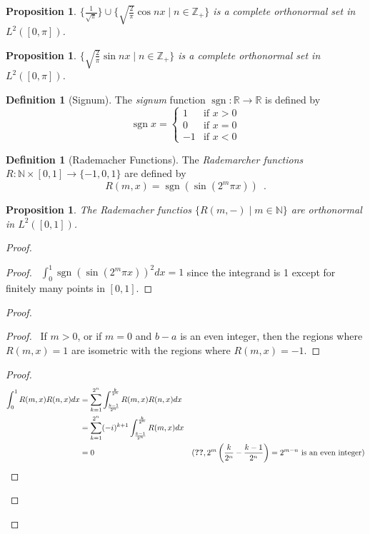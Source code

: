 \documentclass{book}
\let\qed\relax
\newtheorem{prop}[ax]{Proposition}
\theoremstyle{definition}
\newtheorem{df}[ax]{Definition}
\newcommand{\sgn}{\ensuremath{\operatorname{sgn}}}
\begin{document}
\begin{prop}
$\{\frac{1}{\sqrt{\pi}}\} \cup \{\sqrt{\frac{2}{\pi}} \cos nx \mid n \in \mathbb{Z}_+ \}$ is a complete orthonormal set in $L^2([0,\pi])$.
\end{prop}

\begin{prop}
$\{\sqrt{\frac{2}{\pi}} \sin n x \mid n \in \mathbb{Z}_+ \}$ is a complete orthonormal set in $L^2([0,\pi])$.
\end{prop}

\begin{df}[Signum]
The \emph{signum} function $\sgn : \mathbb{R} \rightarrow \mathbb{R}$ is defined by
\[ \sgn x = \begin{cases}
1 & \text{if } x > 0 \\
0 & \text{if } x = 0 \\
-1 & \text{if } x < 0
\end{cases} \]
\end{df}

\begin{df}[Rademacher Functions]
The \emph{Rademarcher functions} $R : \mathbb{N} \times [0,1] \rightarrow \{-1,0,1\}$ are defined by
\[ R(m,x) = \sgn(\sin(2^m \pi x)) \enspace . \]
\end{df}

\begin{prop}
The Rademacher functios $\{ R(m,-) \mid m \in \mathbb{N} \}$ are orthonormal in $L^2([0,1])$.
\end{prop}

\begin{proof}
\pf
{}
\begin{proof}
	\pf\ $\int_0^1 \sgn(\sin(2^m \pi x))^2 dx = 1$ since the integrand is 1 except for finitely many points in $[0,1]$.
\end{proof}
\begin{proof}
	\begin{proof}
		\pf\ If $m > 0$, or if $m = 0$ and $b-a$ is an even integer, then the regions where $R(m,x) = 1$ are isometric with the regions where $R(m,x) = -1$.
	\end{proof}
	\begin{proof}
		\pf
		\begin{align*}
			\int_0^1 R(m,x) R(n,x) dx
			& = \sum_{k=1}^{2^n} \int_{\frac{k-1}{2^n}}^{\frac{k}{2^n}} R(m,x) R(n,x) dx \\
			& = \sum_{k=1}^{2^n} (-i)^{k+1} \int_{\frac{k-1}{2^n}}^{\frac{k}{2^n}} R(m,x)dx \\
			& = 0 & (\text{\stepref{a}}, 2^m\left(\frac{k}{2^n} - \frac{k-1}{2^n}\right) = 2^{m-n} \text{ is an even integer})
		\end{align*}
	\end{proof}
\end{proof}
\qed
\end{proof}
\end{document}
